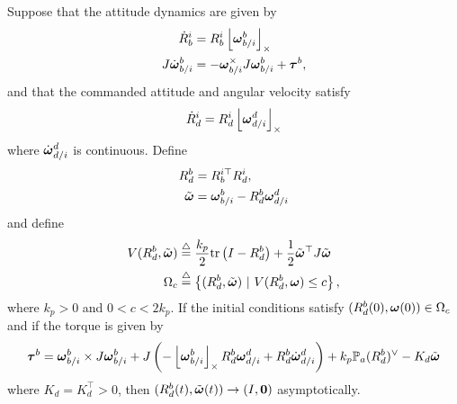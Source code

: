 \begin{theorem}
Suppose that the attitude dynamics are given by
\begin{align}
\dot{R}_b^i &= R_b^i\left\lfloor\boldsymbol{\omega}_{b/i}^b\right\rfloor_{\times} \\
J\dot{\boldsymbol{\omega}}_{b/i}^b &= -\boldsymbol{\omega}_{b/i}^ \times J\boldsymbol{\omega}_{b/i}^b + \boldsymbol{\tau}^b,
\end{align}
and that the commanded attitude and angular velocity satisfy
\[
\dot{R}_d^i = R_d^i \left\lfloor\boldsymbol{\omega}_{d/i}^d\right\rfloor_{\times}
\]
where $\dot{\boldsymbol{\omega}}_{d/i}^d$ is continuous.  
Define 
\begin{align*}
	R_d^b &= R_b^{i\top} R_d^i, \\
	\tilde{\boldsymbol{\omega}}&=\boldsymbol{\omega}_{b/i}^b-R_d^b\boldsymbol{\omega}_{d/i}^d
\end{align*}
 and define
\begin{align*}
V(R_d^b,\tilde{\boldsymbol{\omega}}) &\stackrel{\triangle}{=} \frac{k_p}{2} \text{tr}\left(I-R_d^b\right) + \frac{1}{2} \tilde{\boldsymbol{\omega}}^\top  J \tilde{\boldsymbol{\omega}} \\
\Omega_{c} &\stackrel{\triangle}{=} \left\{(R_d^b,\tilde{\boldsymbol{\omega}}) ~|~ V(R_d^b,\boldsymbol{\omega})\leq c\right\},
\end{align*}
where $k_p>0$ and $0<c<2k_p$.
If the initial conditions satisfy $(R_d^b(0),\boldsymbol{\omega}(0))\in \Omega_c$ and if the torque is given by
\begin{equation}\label{eq:inner-loop-rotation-torque}
\taubf^b = \omegabf_{b/i}^b \times J \omegabf_{b/i}^b + J\left(-\ss{\omegabf_{b/i}^b}R_d^b\omegabf_{d/i}^d + R_d^b\dot{\omegabf}_{d/i}^d\right) + k_p \mathbb{P}_a(R_d^b)^\vee - K_d\tilde{\omegabf} 
\end{equation}
where $K_d=K_d^\top >0$, then $(R_d^b(t), \tilde{\boldsymbol{\omega}}(t)) \to (I, \mathbf{0})$ asymptotically.
\end{theorem}
